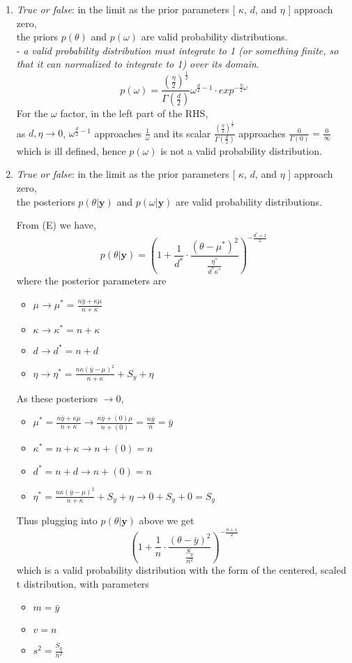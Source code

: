 \documentclass{homework}
\begin{document}
\begin{enumerate}[label=(\Alph*)]
\item \textit{True or false}: in the limit as the prior parameters [ $\kappa$, $d$, and $\eta$ ] approach zero, \\the priors $p(\theta)$ and $p(\omega)$ are valid probability distributions.
\\  - \textit{a valid probability distribution must integrate to 1 (or something finite, so that it can normalized to integrate to 1) over its domain}.
$$ p(\omega) = \frac{(\frac{\eta}{2})^{\frac{1}{2}}}{\Gamma(\frac{d}{2})} \omega^{\frac{d}{2} - 1} \cdot exp^{-\frac{\eta}{2}\omega}$$
For the $\omega$ factor, in the left part of the RHS, \\as $d, \eta \rightarrow 0$, $\omega^{\frac{d}{2} - 1}$ approaches $\frac{1}{\omega}$ and its scalar $ \frac{(\frac{\eta}{2})^{\frac{1}{2}}}{\Gamma(\frac{d}{2})} $ approaches $\frac{0}{\Gamma(0)} = \frac{0}{\infty}$ which is ill defined, hence $p(\omega)$ is not a valid probability distribution.  

\item \textit{True or false}: in the limit as the prior parameters [ $\kappa$, $d$, and $\eta$ ] approach zero, \\the posteriors $p(\theta | \textbf{y})$ and $p(\omega | \textbf{y})$ are valid probability distributions.

From (E) we have,
$$p(\theta | \textbf{y} ) = ( 1 + \frac{1}{d^*} \cdot \frac{(\theta - \mu^*)^2}{\frac{\eta^*}{d^*\kappa^*}})^{-\frac{d^*+1}{2}} $$
where the posterior parameters are 
\begin{itemize}
\item $\mu \rightarrow \mu^* =  \frac{n\bar{y} + \kappa\mu}{n + \kappa}$
\item $\kappa \rightarrow \kappa^* = n + \kappa$ 
\item $d \rightarrow d^* = n + d$  
\item $\eta \rightarrow \eta^* = \frac{ n\kappa( \bar{y} - \mu)^2}{n + \kappa} +  S_y + \eta$
\end{itemize}
As these posteriors $\rightarrow 0$,  
\begin{itemize}
\item $ \mu^* =  \frac{n\bar{y} + \kappa\mu}{n + \kappa} \rightarrow \frac{n\bar{y} + (0)\mu}{n + (0)} = \frac{n\bar{y}}{n} = \bar{y}$
\item $\kappa^* = n + \kappa \rightarrow n + (0) = n$ 
\item $d^* = n + d \rightarrow n + (0) = n$  
\item $\eta^* = \frac{ n\kappa( \bar{y} - \mu)^2}{n + \kappa} +  S_y + \eta \rightarrow 0 + S_y + 0 = S_y$
\end{itemize}
Thus plugging into $p(\theta | \textbf{y} )$ above we get
$$ ( 1 + \frac{1}{n} \cdot \frac{(\theta - \bar{y})^2}{\frac{S_y}{n^2}})^{-\frac{n+1}{2}} $$
which is a valid probability distribution with the form of the centered, scaled t distribution, with parameters
\begin{itemize}
\item $ m = \bar{y}$
\item $ v = n$ 
\item $s^2 = \frac{S_y}{n^2}$
\end{itemize}


\end{enumerate}
\end{document}
